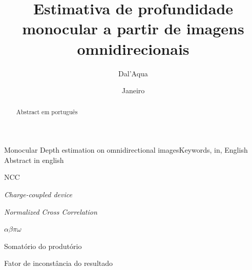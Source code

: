 \documentclass[cic,tc]{iiufrgs}
\title{Estimativa de profundidade monocular a partir de imagens omnidirecionais}
\author{Dal'Aqua}{Lorenzo Pezzi}
\date{Janeiro}{11, 2018}
\begin{document}
\maketitle





\begin{abstract}
    Abstract em português
\end{abstract}

\begin{englishabstract}{Monocular Depth estimation on omnidirectional images}{Keywords, in, English}
    Abstract in english
\end{englishabstract}

\listoffigures

\listoftables

\begin{listofabbrv}{NCC}
	\item[CCD] \textit{Charge-coupled device}
    \item[NCC] \textit{Normalized Cross Correlation}
\end{listofabbrv}

\begin{listofsymbols}{$\alpha\beta\pi\omega$}
    \item[$\sum{\frac{a}{b}}$] Somatório do produtório
    \item[$\alpha\beta\pi\omega$] Fator de inconstância do resultado
\end{listofsymbols}
\end{document}
